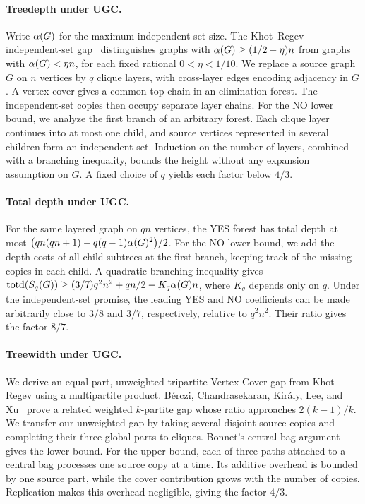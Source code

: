 \paragraph{Treedepth under \textup{UGC}.}
Write $\alpha(G)$ for the maximum independent-set size.
The Khot--Regev independent-set gap~\cite{KhotRegev} distinguishes
graphs with $\alpha(G)\geq(1/2-\eta)n$ from graphs with
$\alpha(G)<\eta n$, for each fixed rational $0<\eta<1/10$. We replace a source
graph $G$ on $n$ vertices by $q$ clique layers, with cross-layer
edges encoding adjacency in $G$.
A vertex cover gives a common top chain in an elimination forest.
The independent-set copies then occupy separate layer chains.
For the NO lower bound, we analyze the first branch of an arbitrary forest.
Each clique layer continues into at most one child, and source
vertices represented in several children form an independent set.
Induction on the number of layers, combined with a branching
inequality, bounds the height without any expansion assumption on
$G$. A fixed choice of $q$ yields each factor below $4/3$.

\paragraph{Total depth under \textup{UGC}.}
For the same layered graph on $qn$ vertices, the YES forest
has total depth at most
$\bigl(qn(qn+1)-q(q-1)\alpha(G)^2\bigr)/2$.
For the NO lower bound, we add the depth costs of all child subtrees at
the first branch, keeping track of the missing copies in each
child. A quadratic branching inequality gives
$\operatorname{totd}(S_q(G))\geq(3/7)q^2n^2+qn/2-K_q\alpha(G)n$,
where $K_q$ depends only on $q$. Under the independent-set promise,
the leading YES and NO coefficients can be made arbitrarily close
to $3/8$ and $3/7$, respectively, relative to $q^2n^2$.
Their ratio gives the factor $8/7$.

\paragraph{Treewidth under \textup{UGC}.}
We derive an equal-part, unweighted tripartite Vertex Cover gap from
Khot--Regev using a multipartite product. B\'erczi, Chandrasekaran,
Kir\'aly, Lee, and Xu~\cite{BCKLX2017} prove a related weighted $k$-partite gap whose
ratio approaches $2(k-1)/k$. We transfer our unweighted gap by taking
several disjoint source copies and completing their three global parts
to cliques. Bonnet's central-bag argument~\cite[Lemma~6]{BonnetTreewidth} gives the lower bound.
For the upper bound, each of three paths attached to a central bag processes
one source copy at a time. Its additive overhead is bounded by one
source part, while the cover contribution grows with the number of
copies. Replication makes this overhead negligible, giving the
factor $4/3$.

